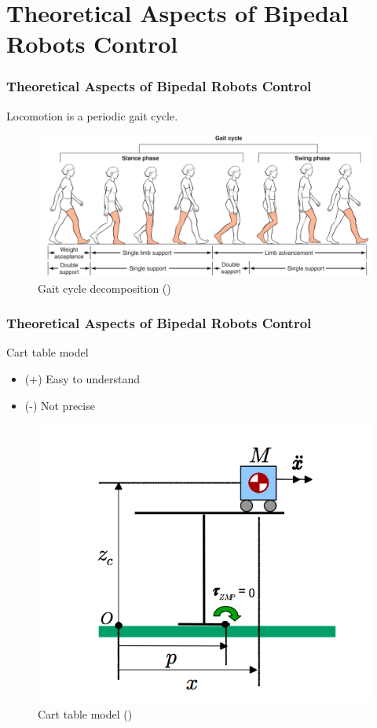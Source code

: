 \documentclass{beamer}
\begin{document}
	\section*{Theoretical Aspects of Bipedal Robots Control}
	\begin{frame}
		\frametitle{Theoretical Aspects of Bipedal Robots Control}
		\centering
		Locomotion is a periodic gait cycle.
		
		\begin{figure}[h!]
			\begin{minipage}[H]{\linewidth}
				\includegraphics[width=\linewidth]{presentation_images/26}
				\caption{Gait cycle decomposition (\cite{gait})}
			\end{minipage}
		\end{figure}
	\end{frame}
	

	\begin{frame}
		\frametitle{Theoretical Aspects of Bipedal Robots Control}
		\begin{block}{Cart table model}
			\begin{itemize}
				\item(+)
					Easy to understand
				\item(-)
					Not precise
			\end{itemize}
		\end{block}
		
		\begin{figure}[h!]
			\begin{minipage}[H]{\linewidth}
				\centering
				\includegraphics[width=0.5\linewidth]{presentation_images/11}
				\caption{Cart table model (\cite{kajita2003biped})}
			\end{minipage}
		\end{figure}
	\end{frame}
\end{document}

